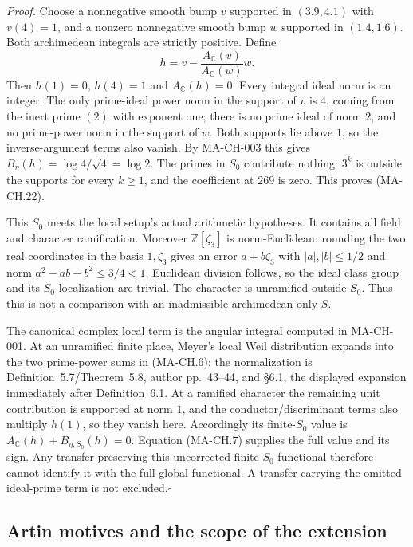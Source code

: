 \emph{Proof.}
Choose a nonnegative smooth bump $v$ supported in
$(3.9,4.1)$ with $v(4)=1$, and a nonzero nonnegative smooth
bump $w$ supported in $(1.4,1.6)$.  Both archimedean
integrals are strictly positive.  Define
\[
             h=v-\frac{A_{\mathbb C}(v)}{A_{\mathbb C}(w)}w.
 \tag{MA-CH.23}
\]
Then $h(1)=0$, $h(4)=1$ and $A_{\mathbb C}(h)=0$.
Every integral ideal norm is an integer.  The only
prime-ideal power norm in the support of $v$ is $4$,
coming from the inert prime $(2)$ with exponent one;
there is no prime ideal of norm $2$, and no prime-power
norm in the support of $w$.  Both supports lie above $1$,
so the inverse-argument terms also vanish.
By MA-CH-003 this gives
$B_\eta(h)=\log4/\sqrt4=\log2$.
The primes in $S_0$ contribute nothing: $3^k$ is outside
the supports for every $k\ge1$, and the coefficient at
$269$ is zero.  This proves (MA-CH.22).

This $S_0$ meets the local setup's actual arithmetic
hypotheses.  It contains all field and character
ramification.  Moreover $\mathbb Z[\zeta_3]$ is
norm-Euclidean: rounding the two real coordinates in the
basis $1,\zeta_3$ gives an error $a+b\zeta_3$ with
$|a|,|b|\le1/2$ and norm
$a^2-ab+b^2\le3/4<1$.  Euclidean division follows, so
the ideal class group and its $S_0$ localization are
trivial.  The character is unramified outside $S_0$.
Thus this is not a comparison with an inadmissible
archimedean-only $S$.

The canonical complex local term is the angular integral
computed in MA-CH-001.  At an unramified finite place,
Meyer's local Weil distribution expands into the two
prime-power sums in (MA-CH.6); the normalization is
Definition~5.7/Theorem~5.8, author pp.~43--44, and
\S6.1, the displayed expansion immediately after
Definition~6.1.  At a ramified character the
remaining unit contribution is supported at norm $1$,
and the conductor/discriminant terms also multiply
$h(1)$, so they vanish here.  Accordingly its finite-$S_0$
value is $A_{\mathbb C}(h)+B_{\eta,S_0}(h)=0$.
Equation (MA-CH.7) supplies the full value and its sign.
Any transfer preserving this uncorrected finite-$S_0$
functional therefore cannot identify it with the full
global functional.  A transfer carrying the omitted
ideal-prime term is not excluded.\hfill$\square$

\subsection{Artin motives and the scope of the extension}

